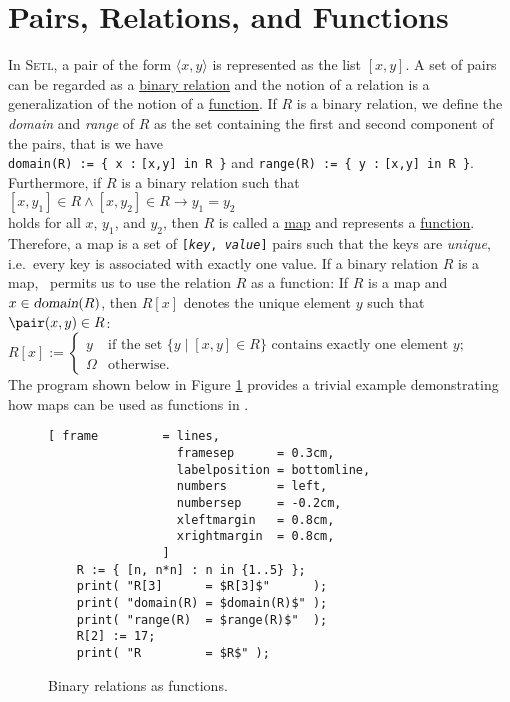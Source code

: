 \section{Pairs, Relations,  and Functions}
In \textsc{Setl}, a pair of the form $\langle x, y \rangle$ is represented as the list $[x,y]$.
A set of pairs can be regarded as a \href{https://en.wikipedia.org/wiki/Binary_relation}{binary relation} and
the notion of a relation is a generalization of the notion of a
\href{https://en.wikipedia.org/wiki/Function_(mathematics)}{function}.   If $R$ is a binary relation, we 
define the \emph{domain} and \emph{range} of $R$ as the set containing the first and second component
of the pairs, that is we have
\\[0.2cm]
\hspace*{1.3cm}
\texttt{domain(R) := \{ x :$\;$[x,y] in R \}} \quad and \quad
\texttt{range(R)  := \{ y :$\;$[x,y] in R \}}.
\\[0.2cm]
Furthermore, if $R$ is a binary relation
such that 
\\[0.2cm]
\hspace*{1.3cm}
$[x,y_1] \in R \wedge [x,y_2] \in R \rightarrow y_1 = y_2$ 
\\[0.2cm]
holds for all $x$, $y_1$, and $y_2$, then $R$ is called a
\href{https://en.wikipedia.org/wiki/Map_(mathematics)}{map} and represents a 
\href{https://en.wikipedia.org/wiki/Function_(mathematics)}{function}.
Therefore, a map is a set of \texttt{[\textsl{key}, \textsl{value}]} pairs such that the
keys are \emph{unique}, i.e.~every key is associated with exactly one value.
If a binary relation $R$ is a map, \setlx\ permits us to use the relation $R$ as a function:  If $R$ is a map
and $x \in \textsl{domain}(R)$, then $R[x]$ denotes the unique element $y$ such that 
$\pair(x,y) \in R$:
\\[0.2cm]
\hspace*{1.3cm}
$R[x] := \left\{
\begin{array}{ll}
  y & \mbox{if the set $\{ y \mid [x,y] \in R\}$ contains exactly one element $y$;} \\[0.2cm]
  \Omega & \mbox{otherwise}.
\end{array} \right.
$
\\[0.2cm]
The program shown below in Figure
\ref{fig:map.stlx} provides a trivial example demonstrating how maps can be used
as functions in  \setlx.  
 

\begin{figure}[!ht]
  \centering
\begin{Verbatim}[ frame         = lines, 
                  framesep      = 0.3cm, 
                  labelposition = bottomline,
                  numbers       = left,
                  numbersep     = -0.2cm,
                  xleftmargin   = 0.8cm,
                  xrightmargin  = 0.8cm,
                ]
    R := { [n, n*n] : n in {1..5} };
    print( "R[3]      = $R[3]$"      );
    print( "domain(R) = $domain(R)$" );
    print( "range(R)  = $range(R)$"  );
    R[2] := 17;
    print( "R         = $R$" );
\end{Verbatim} 
\vspace*{-0.3cm}
\caption{Binary relations as functions.}  \label{fig:map.stlx}
\end{figure} %

